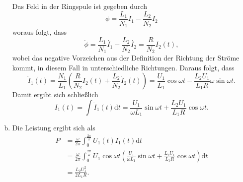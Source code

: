\begin{enumerate}[(a)]
Das Feld in der Ringspule ist gegeben durch
\begin{equation}
  \phi=\frac{L_1}{N_1}I_1-\frac{L_2}{N_2}I_2
\end{equation}
woraus folgt, dass
\begin{equation}
  \dot{\phi}=\frac{L_1}{N_1}\dot{I_1}-\frac{L_2}{N_2}\dot{I_2}=\frac{R}{N_2}I_2(t),
\end{equation}
wobei das negative Vorzeichen aus der Definition der Richtung der Ströme kommt, in diesem Fall in unterschiedliche Richtungen.
Daraus folgt, dass 
\begin{equation}
  \dot{I}_1(t)=\frac{N_1}{L_1}\left(\frac{R}{N_2}I_2(t) + \frac{L_2}{N_2}\dot{I}_2(t)\right)=\frac{U_1}{L_1}\cos \omega t - \frac{L_2U_1}{L_1R}\omega \sin \omega t.
\end{equation}
Damit ergibt sich schließlich
\begin{equation}
  I_1(t)=\int \dot{I}_1(t) \mathrm{d}t=\frac{U_1}{\omega L_1} \sin \omega t+\frac{L_2U_1}{L_1R}\cos \omega t.
\end{equation}
\item Die Leistung ergibt sich als
\begin{align}
  P&=\frac{\omega}{2\pi}\int_{0}^{\frac{2\pi}{\omega}}U_1(t)I_1(t)\mathrm{d}t\\
  &=\frac{\omega}{2\pi}\int_{0}^{\frac{2\pi}{\omega}}U_1 \cos \omega t\left(\frac{U_1}{\omega L_1} \sin \omega t+\frac{L_2U_1}{L_1R}\cos \omega t\right)\mathrm{d}t\\
  &= \frac{L_2U_1^2}{2L_1R}.
\end{align}

\end{enumerate}
